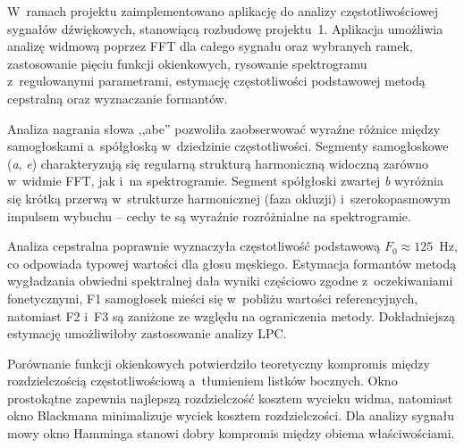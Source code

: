 \documentclass[a4paper,12pt]{article}
\begin{document}
W~ramach projektu zaimplementowano aplikację do analizy częstotliwościowej sygnałów 
dźwiękowych, stanowiącą rozbudowę projektu~1. Aplikacja umożliwia analizę widmową 
poprzez FFT dla całego sygnału oraz wybranych ramek, zastosowanie pięciu funkcji 
okienkowych, rysowanie spektrogramu z~regulowanymi parametrami, estymację 
częstotliwości podstawowej metodą cepstralną oraz wyznaczanie formantów.

Analiza nagrania słowa ,,abe'' pozwoliła zaobserwować wyraźne różnice między 
samogłoskami a~spółgłoską w~dziedzinie częstotliwości. Segmenty samogłoskowe 
(\textit{a}, \textit{e}) charakteryzują się regularną strukturą harmoniczną 
widoczną zarówno w~widmie FFT, jak i~na spektrogramie. Segment spółgłoski zwartej 
\textit{b} wyróżnia się krótką przerwą w~strukturze harmonicznej (faza okluzji) 
i~szerokopasmowym impulsem wybuchu -- cechy te są wyraźnie rozróżnialne na 
spektrogramie.

Analiza cepstralna poprawnie wyznaczyła częstotliwość podstawową $F_0 \approx 125$~Hz, 
co odpowiada typowej wartości dla głosu męskiego. Estymacja formantów metodą 
wygładzania obwiedni spektralnej dała wyniki częściowo zgodne z~oczekiwaniami 
fonetycznymi, F1 samogłosek mieści się w~pobliżu wartości referencyjnych, 
natomiast F2 i~F3 są zaniżone ze względu na ograniczenia metody. Dokładniejszą 
estymację umożliwiłoby zastosowanie analizy LPC.

Porównanie funkcji okienkowych potwierdziło teoretyczny kompromis między 
rozdzielczością częstotliwościową a~tłumieniem listków bocznych. Okno prostokątne 
zapewnia najlepszą rozdzielczość kosztem wycieku widma, natomiast okno Blackmana 
minimalizuje wyciek kosztem rozdzielczości. Dla analizy sygnału mowy okno Hamminga 
stanowi dobry kompromis między obiema właściwościami.
\end{document}
